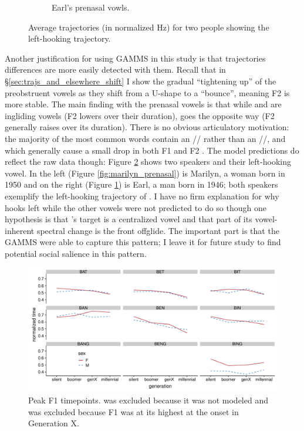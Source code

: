 \begin{figure}[tb!]
\begin{subfigure}[t]{2.925in}
        \caption{Earl's prenasal vowls.}
        \label{fig:earl_prenasal}
    \end{subfigure}
    \hspace{\fill}
    \caption{Average trajectories (in normalized Hz) for two people showing the left-hooking \ben trajectory.}
    \label{fig:marilyn_and_earl}
\end{figure}

Another justification for using GAMMS in this study is that trajectories differences are more easily detected with them. Recall that in \S\ref{sec:trajs_and_elsewhere_shift} I show the gradual ``tightening up'' of the preobstruent vowels as they shift from a U-shape to a ``bounce'', meaning F2 is more stable. The main finding with the prenasal vowels is that while \bin and \ban are ingliding vowels (F2 lowers over their duration), \ben goes the opposite way (F2 generally raises over its duration). There is no obvious articulatory motivation: the majority of the most common \ben words contain an // rather than an //, and which generally cause a small drop in both F1 and F2 \citep[143, 193]{olive_etal_1993}. The model predictions do reflect the raw data though: Figure \ref{fig:marilyn_and_earl} shows two speakers and their left-hooking \ben vowel. In the left (Figure \ref{fig:marilyn_prenasal}) is Marilyn, a woman born in 1950 and on the right (Figure \ref{fig:earl_prenasal}) is Earl, a man born in 1946; both speakers exemplify the left-hooking trajectory of \ben. I have no firm explanation for why \ben hooks left while the other vowels were not predicted to do so though one hypothesis is that \ben's target is a centralized vowel and that part of its vowel-inherent spectral change is the front offglide. The important part is that the GAMMS were able to capture this pattern; I leave it for future study to find potential social salience in this pattern.





\begin{figure}[tb!]
    \centering
    \includegraphics[width = 6.5in]{Figures/other_figures/change_in_nucleus.pdf}
    \caption[Peak F1 timepoints]{Peak F1 timepoints. \beng was excluded because it was not modeled and \bang was excluded because F1 was at its highest at the onset in Generation X.}
    \label{fig:change_in_nucleus}
\end{figure}

